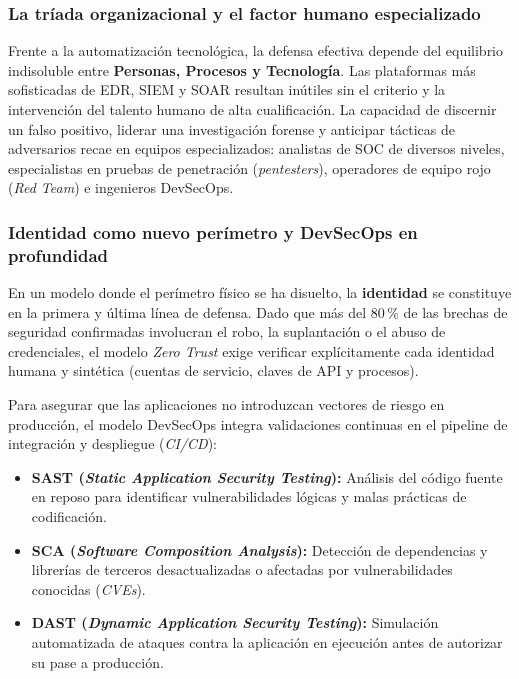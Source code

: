 \subsubsection*{\textcolor{unabblue}{}\quad La tríada organizacional y el factor humano especializado}
Frente a la automatización tecnológica, la defensa efectiva depende del equilibrio indisoluble entre \textbf{Personas, Procesos y Tecnología}. Las plataformas más sofisticadas de EDR, SIEM y SOAR resultan inútiles sin el criterio y la intervención del talento humano de alta cualificación. La capacidad de discernir un falso positivo, liderar una investigación forense y anticipar tácticas de adversarios recae en equipos especializados: analistas de SOC de diversos niveles, especialistas en pruebas de penetración (\textit{pentesters}), operadores de equipo rojo (\textit{Red Team}) e ingenieros DevSecOps.

\subsubsection*{\textcolor{unabblue}{}\quad Identidad como nuevo perímetro y DevSecOps en profundidad}
En un modelo donde el perímetro físico se ha disuelto, la \textbf{identidad} se constituye en la primera y última línea de defensa. Dado que más del 80\,\% de las brechas de seguridad confirmadas involucran el robo, la suplantación o el abuso de credenciales, el modelo \textit{Zero Trust} exige verificar explícitamente cada identidad humana y sintética (cuentas de servicio, claves de API y procesos).

Para asegurar que las aplicaciones no introduzcan vectores de riesgo en producción, el modelo DevSecOps integra validaciones continuas en el pipeline de integración y despliegue (\textit{CI/CD}):
\begin{itemize}
  \item \textbf{SAST (\textit{Static Application Security Testing}):} Análisis del código fuente en reposo para identificar vulnerabilidades lógicas y malas prácticas de codificación.
  \item \textbf{SCA (\textit{Software Composition Analysis}):} Detección de dependencias y librerías de terceros desactualizadas o afectadas por vulnerabilidades conocidas (\textit{CVEs}).
  \item \textbf{DAST (\textit{Dynamic Application Security Testing}):} Simulación automatizada de ataques contra la aplicación en ejecución antes de autorizar su pase a producción.
\end{itemize}

